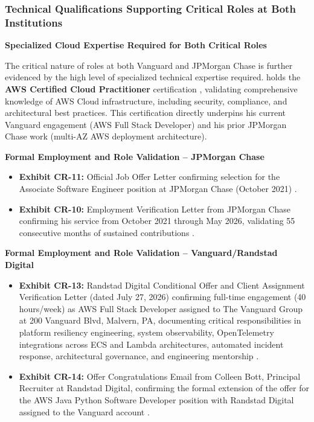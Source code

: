\subsubsection{Technical Qualifications Supporting Critical Roles at Both Institutions}
\label{critical:qualifications}

\textbf{Specialized Cloud Expertise Required for Both Critical Roles}

The critical nature of \drs roles at both Vanguard and JPMorgan Chase is further evidenced by the high level of specialized technical expertise required. \dr holds the \textbf{AWS Certified Cloud Practitioner} certification \cite{CR8}, validating comprehensive knowledge of AWS Cloud infrastructure, including security, compliance, and architectural best practices. This certification directly underpins his current Vanguard engagement (AWS Full Stack Developer) and his prior JPMorgan Chase work (multi-AZ AWS deployment architecture).

\textbf{Formal Employment and Role Validation -- JPMorgan Chase}

\begin{itemize}
    \item \textbf{Exhibit CR-11:} Official Job Offer Letter confirming \drs selection for the Associate Software Engineer position at JPMorgan Chase (October 2021) \cite{CR11}.
    \item \textbf{Exhibit CR-10:} Employment Verification Letter from JPMorgan Chase confirming his service from October 2021 through May 2026, validating 55 consecutive months of sustained contributions \cite{CR10}.
\end{itemize}

\textbf{Formal Employment and Role Validation -- Vanguard/Randstad Digital}

\begin{itemize}
    \item \textbf{Exhibit CR-13:} Randstad Digital Conditional Offer and Client Assignment Verification Letter (dated July 27, 2026) confirming \drs full-time engagement (40 hours/week) as AWS Full Stack Developer assigned to The Vanguard Group at 200 Vanguard Blvd, Malvern, PA, documenting critical responsibilities in platform resiliency engineering, system observability, OpenTelemetry integrations across ECS and Lambda architectures, automated incident response, architectural governance, and engineering mentorship \cite{CR13}.
    \item \textbf{Exhibit CR-14:} Offer Congratulations Email from Colleen Bott, Principal Recruiter at Randstad Digital, confirming the formal extension of the offer for the AWS Java Python Software Developer position with Randstad Digital assigned to the Vanguard account \cite{CR14}.
\end{itemize}

